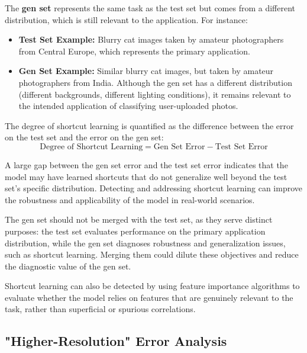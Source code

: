 \documentclass[12pt,openany, draft]{book}
\begin{document}
The \textbf{gen set} represents the same task as the test set but comes from a different distribution, which is still relevant to the application. For instance:
\begin{itemize}
    \item \textbf{Test Set Example:} Blurry cat images taken by amateur photographers from Central Europe, which represents the primary application.
    \item \textbf{Gen Set Example:} Similar blurry cat images, but taken by amateur photographers from India. Although the gen set has a different distribution (different backgrounds, different lighting conditions), it remains relevant to the intended application of classifying user-uploaded photos.
\end{itemize}

The degree of shortcut learning is quantified as the difference between the error on the test set and the error on the gen set:
\[
\text{Degree of Shortcut Learning} = \text{Gen Set Error} - \text{Test Set Error}
\]

A large gap between the gen set error and the test set error indicates that the model may have learned shortcuts that do not generalize well beyond the test set's specific distribution. Detecting and addressing shortcut learning can improve the robustness and applicability of the model in real-world scenarios. \newline

\begin{notebox}
The gen set should not be merged with the test set, as they serve distinct purposes: the test set evaluates performance on the primary application distribution, while the gen set diagnoses robustness and generalization issues, such as shortcut learning. Merging them could dilute these objectives and reduce the diagnostic value of the gen set.
\end{notebox}

\begin{notebox}
Shortcut learning can also be detected by using feature importance algorithms to evaluate whether the model relies on features that are genuinely relevant to the task, rather than superficial or spurious correlations.
\end{notebox}


\subsection{"Higher-Resolution" Error Analysis}
\end{document}
